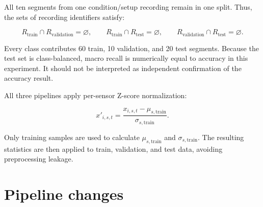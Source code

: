 \documentclass[11pt,a4paper]{article}
\begin{document}
All ten segments from one condition/setup recording remain in one split. Thus,
the sets of recording identifiers satisfy:

\[
R_{\mathrm{train}} \cap R_{\mathrm{validation}} = \varnothing,
\qquad
R_{\mathrm{train}} \cap R_{\mathrm{test}} = \varnothing,
\qquad
R_{\mathrm{validation}} \cap R_{\mathrm{test}} = \varnothing.
\]

Every class contributes 60 train, 10 validation, and 20 test segments. Because
the test set is class-balanced, macro recall is numerically equal to accuracy
in this experiment. It should not be interpreted as independent confirmation
of the accuracy result.

All three pipelines apply per-sensor Z-score normalization:

\[
x'_{i,s,t}
=
\frac{x_{i,s,t}-\mu_{s,\mathrm{train}}}
     {\sigma_{s,\mathrm{train}}}.
\]

Only training samples are used to calculate \(\mu_{s,\mathrm{train}}\) and
\(\sigma_{s,\mathrm{train}}\). The resulting statistics are then applied to
train, validation, and test data, avoiding preprocessing leakage.

\section{Pipeline changes}
\end{document}
